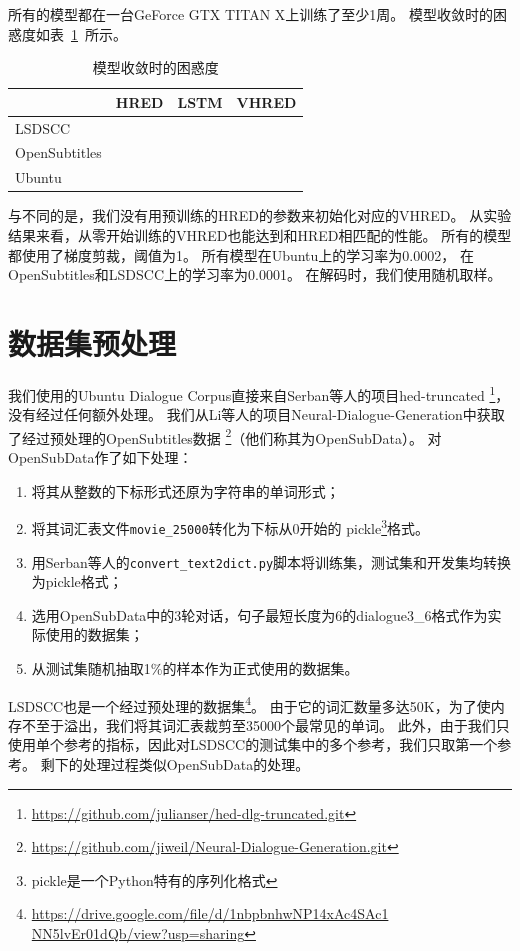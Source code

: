 所有的模型都在一台GeForce GTX TITAN X上训练了至少1周。
模型收敛时的困惑度如表~\ref{tab:converged_perplexity}~所示。
\begin{table}[H]
    \centering
    \caption{模型收敛时的困惑度}
    \label{tab:converged_perplexity}
    \begin{tabular}{llll}
        \toprule
        & HRED & LSTM & VHRED \\
        \midrule
        LSDSCC & & &  \\
        OpenSubtitles & & &  \\
        Ubuntu & & &  \\
        \bottomrule
    \end{tabular}
\end{table}

与\cite{VHRED}不同的是，我们没有用预训练的HRED的参数来初始化对应的VHRED。
从实验结果来看，从零开始训练的VHRED也能达到和HRED相匹配的性能。
所有的模型都使用了梯度剪裁，阈值为1。
所有模型在Ubuntu上的学习率为0.0002，
在OpenSubtitles和LSDSCC上的学习率为0.0001。
在解码时，我们使用随机取样。

\section{数据集预处理}
\label{sec:dataset_proprecessing}
我们使用的Ubuntu Dialogue Corpus直接来自Serban等人的项目hed-truncated
\footnote{\url{https://github.com/julianser/hed-dlg-truncated.git}}，没有经过任何额外处理。
我们从Li等人的项目Neural-Dialogue-Generation中获取了经过预处理的OpenSubtitles数据
\footnote{\url{https://github.com/jiweil/Neural-Dialogue-Generation.git}}（他们称其为OpenSubData）。
对OpenSubData作了如下处理：
\begin{enumerate}
    \item 将其从整数的下标形式还原为字符串的单词形式；
    \item 将其词汇表文件\texttt{movie\_25000}转化为下标从0开始的
    pickle\footnote{pickle是一个Python特有的序列化格式}格式。
    \item 用Serban等人的\texttt{convert\_text2dict.py}脚本将训练集，测试集和开发集均转换为pickle格式；
    \item 选用OpenSubData中的3轮对话，句子最短长度为6的dialogue3\_6格式作为实际使用的数据集；
    \item 从测试集随机抽取1\%的样本作为正式使用的数据集。
\end{enumerate}

LSDSCC也是一个经过预处理的数据集\footnote{\url{https://drive.google.com/file/d/1nbpbnhwNP14xAc4SAc1 NN5lvEr01dQb/view?usp=sharing}}。
由于它的词汇数量多达50K，为了使内存不至于溢出，我们将其词汇表裁剪至35000个最常见的单词。
此外，由于我们只使用单个参考的指标，因此对LSDSCC的测试集中的多个参考，我们只取第一个参考。
剩下的处理过程类似OpenSubData的处理。

